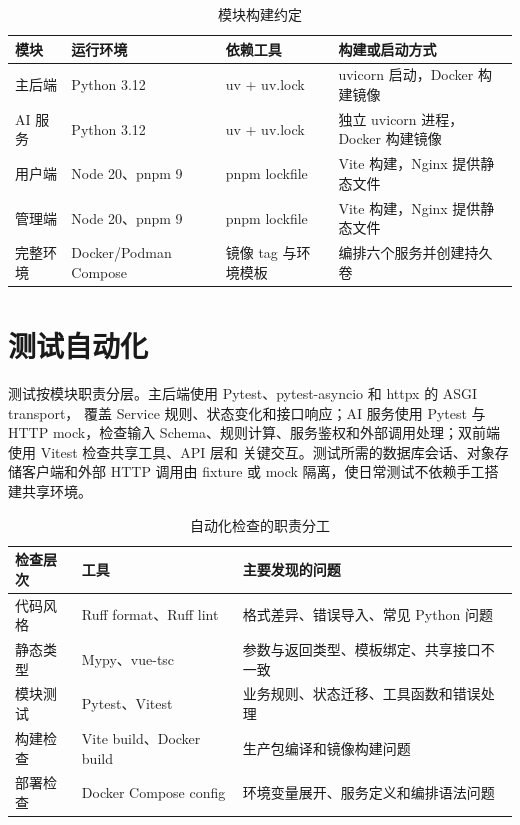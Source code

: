 \begin{table}[H]
  \centering
  \caption{模块构建约定}
  \begin{tabularx}{\textwidth}{L{3.0cm}L{3.3cm}L{3.9cm}Y}
    \toprule
    模块 & 运行环境 & 依赖工具 & 构建或启动方式 \\
    \midrule
    主后端 & Python 3.12 & uv + uv.lock & uvicorn 启动，Docker 构建镜像 \\
    AI 服务 & Python 3.12 & uv + uv.lock & 独立 uvicorn 进程，Docker 构建镜像 \\
    用户端 & Node 20、pnpm 9 & pnpm lockfile & Vite 构建，Nginx 提供静态文件 \\
    管理端 & Node 20、pnpm 9 & pnpm lockfile & Vite 构建，Nginx 提供静态文件 \\
    完整环境 & Docker/Podman Compose & 镜像 tag 与环境模板 & 编排六个服务并创建持久卷 \\
    \bottomrule
  \end{tabularx}
\end{table}

\section{测试自动化}

测试按模块职责分层。主后端使用 Pytest、pytest-asyncio 和 httpx 的 ASGI transport，
覆盖 Service 规则、状态变化和接口响应；AI 服务使用 Pytest 与 HTTP mock，检查输入
Schema、规则计算、服务鉴权和外部调用处理；双前端使用 Vitest 检查共享工具、API 层和
关键交互。测试所需的数据库会话、对象存储客户端和外部 HTTP 调用由 fixture 或 mock
隔离，使日常测试不依赖手工搭建共享环境。

\begin{table}[H]
  \centering
  \caption{自动化检查的职责分工}
  \begin{tabularx}{\textwidth}{L{3.1cm}L{4.0cm}Y}
    \toprule
    检查层次 & 工具 & 主要发现的问题 \\
    \midrule
    代码风格 & Ruff format、Ruff lint & 格式差异、错误导入、常见 Python 问题 \\
    静态类型 & Mypy、vue-tsc & 参数与返回类型、模板绑定、共享接口不一致 \\
    模块测试 & Pytest、Vitest & 业务规则、状态迁移、工具函数和错误处理 \\
    构建检查 & Vite build、Docker build & 生产包编译和镜像构建问题 \\
    部署检查 & Docker Compose config & 环境变量展开、服务定义和编排语法问题 \\
    \bottomrule
  \end{tabularx}
\end{table}

